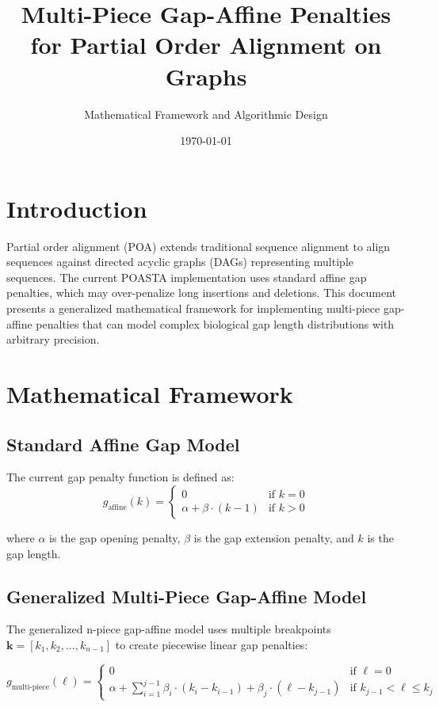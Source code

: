 \documentclass[11pt]{article}
\title{Multi-Piece Gap-Affine Penalties for Partial Order Alignment on Graphs}
\author{Mathematical Framework and Algorithmic Design}
\date{\today}
\begin{document}
\maketitle

\section{Introduction}

Partial order alignment (POA) extends traditional sequence alignment to align sequences against directed acyclic graphs (DAGs) representing multiple sequences. The current POASTA implementation uses standard affine gap penalties, which may over-penalize long insertions and deletions. This document presents a generalized mathematical framework for implementing multi-piece gap-affine penalties that can model complex biological gap length distributions with arbitrary precision.

\section{Mathematical Framework}

\subsection{Standard Affine Gap Model}

The current gap penalty function is defined as:
\begin{equation}
g_{\text{affine}}(k) = \begin{cases} 
0 & \text{if } k = 0 \\
\alpha + \beta \cdot (k-1) & \text{if } k > 0
\end{cases}
\end{equation}

where $\alpha$ is the gap opening penalty, $\beta$ is the gap extension penalty, and $k$ is the gap length.

\subsection{Generalized Multi-Piece Gap-Affine Model}

The generalized n-piece gap-affine model uses multiple breakpoints $\mathbf{k} = [k_1, k_2, ..., k_{n-1}]$ to create piecewise linear gap penalties:

\begin{equation}
g_{\text{multi-piece}}(\ell) = \begin{cases}
0 & \text{if } \ell = 0 \\
\alpha + \sum_{i=1}^{j-1} \beta_i \cdot (k_i - k_{i-1}) + \beta_j \cdot (\ell - k_{j-1}) & \text{if } k_{j-1} < \ell \leq k_j
\end{cases}
\end{equation}
\end{document}
